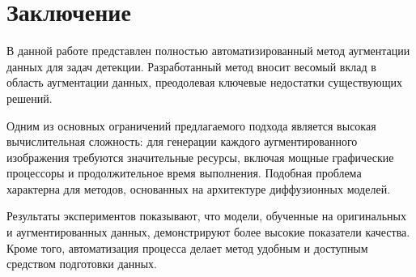 \section{Заключение}

В данной работе представлен полностью автоматизированный метод аугментации данных для задач детекции. Разработанный метод вносит весомый вклад в область аугментации данных, преодолевая ключевые недостатки существующих решений.

Одним из основных ограничений предлагаемого подхода является высокая вычислительная сложность: для генерации каждого аугментированного изображения требуются значительные ресурсы, включая мощные графические процессоры и продолжительное время выполнения. Подобная проблема характерна для методов, основанных на архитектуре диффузионных моделей.

Результаты экспериментов показывают, что модели, обученные на оригинальных и аугментированных данных, демонстрируют более высокие показатели качества. Кроме того, автоматизация процесса делает метод удобным и доступным средством подготовки данных.